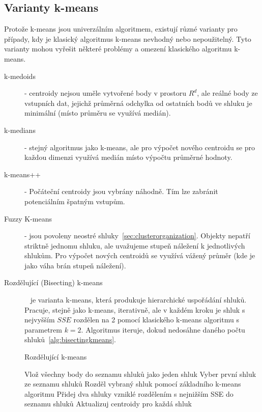 \subsection{Varianty k-means}
Protože k-means jsou univerzálním algoritmem, existují různé varianty pro případy, kdy je klasický algoritmus k-means nevhodný nebo nepoužitelný. Tyto varianty mohou vyřešit některé problémy a omezení klasického algoritmu k-means.
\begin{description}
\item[k-medoids] - centroidy nejsou uměle vytvořené body v prostoru $R^d$, ale reálné body ze vstupních dat, jejichž průměrná odchylka od ostatních bodů ve shluku je minimální (místo průměru se využívá medián).
\item[k-medians] - stejný algoritmus jako k-means, ale pro výpočet nového centroidu se pro každou dimenzi využívá medián místo výpočtu průměrné hodnoty.
\item[k-means++] - Počáteční centroidy jsou vybrány náhodně. Tím lze zabránit potenciálním špatným vstupům.
\item[Fuzzy K-means] - jsou povoleny neostré shluky~\ref{sec:clusterorganization}. Objekty nepatří striktně jednomu shluku, ale uvažujeme stupeň náležení k jednotlivých shlukům. Pro výpočet nových centroidů se využívá vážený průměr (kde je jako váha brán stupeň náležení).
\item[Rozdělující (Bisecting) k-means]~\cite{Tan05} je varianta k-means, která produkuje hierarchické uspořádání shluků. Pracuje, stejně jako k-means, iterativně, ale v každém kroku je shluk s nejvyšším $SSE$ rozdělen na 2 pomocí klasického k-means algoritmu s parametrem $k=2$. Algoritmus iteruje, dokud nedosáhne daného počtu shluků~\autoref{alg:bisectingkmeans}.
\begin{algorithm}
\caption{Rozdělující k-means}\label{alg:bisectingkmeans}
\begin{algorithmic}[1]
\State Vlož všechny body do seznamu shluků jako jeden shluk
\Repeat
\State Vyber první shluk ze seznamu shluků
\State Rozděl vybraný shluk pomocí základního k-means algoritmu
\EndFor
\State Přidej dva shluky vzniklé rozdělením s nejnižším SSE do seznamu shluků
\State Aktualizuj centroidy pro každá shluk
\end{algorithmic}
\end{algorithm}

\end{description}
